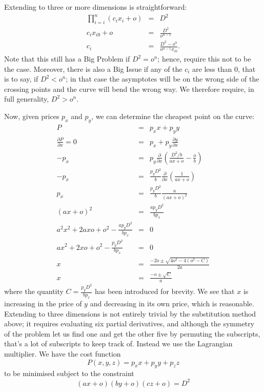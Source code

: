 \documentclass[12pt]{book}
\begin{document}
Extending to three or more dimensions is straightforward:
\begin{eqnarray*}
\prod_{i=i}^{n}(c_ix_i + o) &=& D^2\\
c_ix_{i0} + o &=& \frac{D^2}{o^{n-1}}\\
c_i &=& \frac{D^2-o^n}{o^{n-1}x_{i0}}.
\end{eqnarray*}
Note that this still has a Big Problem if $D^2=o^n$; hence, require this
not to be the case. Moreover, there is also a Big Issue if any of the
$c_i$ are less than 0, that is to say, if $D^2<o^n$; in that case the
asymptotes will be on the wrong side of the crossing points and the
curve will bend the wrong way. We therefore require, in full
generality, $D^2>o^n$.

Now, given prices $p_x$ and $p_y$, we can determine the cheapest point
on the curve:
\begin{eqnarray*}
P &=& p_xx + p_yy\\
\frac{\partial P}{\partial x} = 0 &=& p_x + p_y\frac{\partial y}{\partial x}\\
-p_x &=& p_y\frac{\partial }{\partial x}\left(\frac{D^2/b}{ax+o}-\frac{o}{b}\right)\\
-p_x &=& \frac{p_yD^2}{b}\frac{\partial }{\partial x}\left(\frac{1}{ax+o}\right)\\
p_x &=& \frac{p_yD^2}{b}\frac{a}{(ax+o)^2}\\
(ax+o)^2 &=& \frac{ap_yD^2}{bp_x}\\
a^2x^2 + 2axo + o^2 - \frac{ap_yD^2}{bp_x} &=& 0 \\
ax^2 + 2xo + o^2 - \frac{p_yD^2}{bp_x} &=& 0 \\
x &=& \frac{-2o\pm\sqrt{4o^2 - 4(o^2 - C)}}{2a} \\
x &=& \frac{-o\pm\sqrt{C}}{a}
\end{eqnarray*}
where the quantity $C = \frac{p_yD^2}{bp_x}$ has been
introduced for brevity. We see that $x$ is increasing in the price of
$y$ and decreasing in its own price, which is reasonable. Extending to
three dimensions is not entirely trivial by the substitution method
above; it requires evaluating six partial derivatives, and although
the symmetry of the problem let us find one and get the other five by
permuting the subscripts, that's a lot of subscripts to keep track
of. Instead we use the Lagrangian multiplier. We have the cost
function
\begin{equation}
P(x,y,z) = p_xx+p_yy+p_zz
\end{equation}
to be minimised subject to the constraint
\begin{equation}
(ax+o)(by+o)(cz+o) = D^2
\end{equation}
\end{document}
